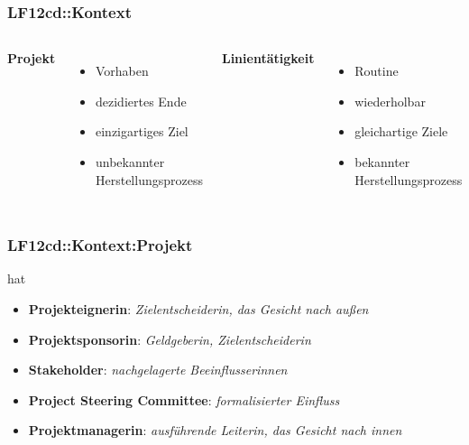 
\begin{frame}  
  \frametitle{LF12cd::Kontext}

  \begin{center}
  \begin{columns}[t]
    \textbf{Projekt} 
    
    \vspace{0.4cm}
    \begin{itemize}
      \item Vorhaben
      \item dezidiertes Ende
      \item einzigartiges Ziel
      \item unbekannter Herstellungsprozess
    \end{itemize}
    \textbf{Linientätigkeit} 
    
    \vspace{0.4cm}
    \begin{itemize}
      \item Routine
      \item wiederholbar 
      \item gleichartige Ziele
      \item bekannter Herstellungsprozess
    \end{itemize}
 
  \end{columns}
  \end{center}
\end{frame}


\begin{frame}  
  \frametitle{LF12cd::Kontext:Projekt}

   hat
    
    \vspace{0.4cm}
    \begin{itemize}
      \item \textbf{Projekteignerin}: \textit{\textrm{Zielentscheiderin, das Gesicht nach außen}}
      \item \textbf{Projektsponsorin}: \textit{\textrm{Geldgeberin, Zielentscheiderin}}
      \item \textbf{Stakeholder}: \textit{\textrm{nachgelagerte Beeinflusserinnen}}
      \item \textbf{Project Steering Committee}: \textit{\textrm{formalisierter Einfluss}}
      \item \textbf{Projektmanagerin}: \textit{\textrm{ausführende Leiterin, das Gesicht nach innen}}
    \end{itemize}

\end{frame}


